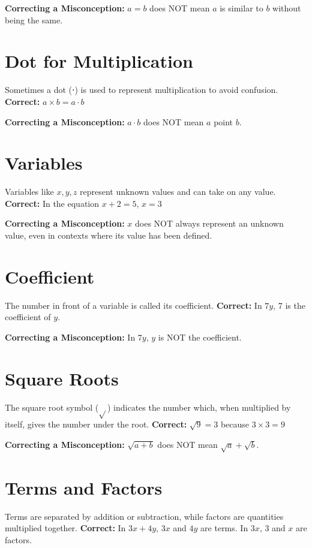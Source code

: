 \documentclass[12pt]{article}
\begin{document}
\textbf{Correcting a Misconception:} \(a = b\) does NOT mean \(a\) is similar to \(b\) without being the same.

\section*{Dot for Multiplication}
Sometimes a dot (⋅) is used to represent multiplication to avoid confusion.
\textbf{Correct:} \(a \times b = a \cdot b\)

\textbf{Correcting a Misconception:} \(a \cdot b\) does NOT mean \(a\) point \(b\).

\section*{Variables}
Variables like \(x, y, z\) represent unknown values and can take on any value.
\textbf{Correct:} In the equation \(x + 2 = 5\), \(x = 3\)

\textbf{Correcting a Misconception:} \(x\) does NOT always represent an unknown value, even in contexts where its value has been defined.

\section*{Coefficient}
The number in front of a variable is called its coefficient.
\textbf{Correct:} In \(7y\), 7 is the coefficient of \(y\).

\textbf{Correcting a Misconception:} In \(7y\), \(y\) is NOT the coefficient.

\section*{Square Roots}
The square root symbol (\(\sqrt{} \)) indicates the number which, when multiplied by itself, gives the number under the root.
\textbf{Correct:} \(\sqrt{9} = 3\) because \(3 \times 3 = 9\)

\textbf{Correcting a Misconception:} \(\sqrt{a + b}\) does NOT mean \(\sqrt{a} + \sqrt{b}\).

\section*{Terms and Factors}
Terms are separated by addition or subtraction, while factors are quantities multiplied together.
\textbf{Correct:} In \(3x + 4y\), \(3x\) and \(4y\) are terms. In \(3x\), 3 and \(x\) are factors.
\end{document}
